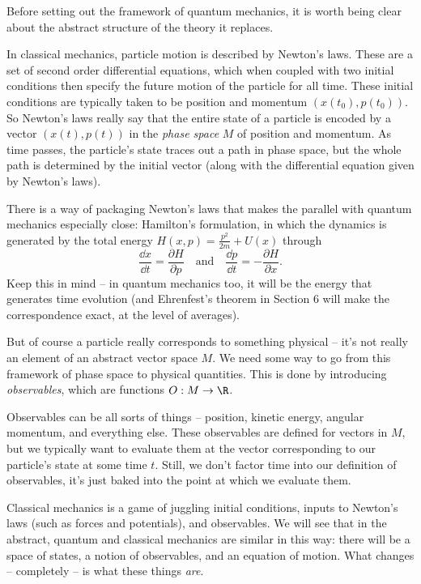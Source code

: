 Before setting out the framework of quantum mechanics, it is worth being clear about the abstract structure of the theory it replaces.

In classical mechanics, particle motion is described by Newton's laws. These are a set of second order differential equations, which when coupled with two initial conditions then specify the future motion of the particle for all time. These initial conditions are typically taken to be position and momentum $(x(t_0), p(t_0))$. So Newton's laws really say that the entire state of a particle is encoded by a vector $(x(t), p(t))$ in the \emph{phase space} $M$ of position and momentum. As time passes, the particle's state traces out a path in phase space, but the whole path is determined by the initial vector (along with the differential equation given by Newton's laws).

There is a way of packaging Newton's laws that makes the parallel with quantum mechanics especially close: Hamilton's formulation, in which the dynamics is generated by the total energy $H(x, p) = \frac{p^2}{2m} + U(x)$ through
$$
\frac{\dd x}{\dd t} = \frac{\partial H}{\partial p} \quad \text{and} \quad \frac{\dd p}{\dd t} = -\frac{\partial H}{\partial x}.
$$
Keep this in mind -- in quantum mechanics too, it will be the energy that generates time evolution (and Ehrenfest's theorem in Section 6 will make the correspondence exact, at the level of averages).

But of course a particle really corresponds to something physical -- it's not really an element of an abstract vector space $M$. We need some way to go from this framework of phase space to physical quantities. This is done by introducing \emph{observables}, which are functions $O: M \rightarrow \R$.

Observables can be all sorts of things -- position, kinetic energy, angular momentum, and everything else. These observables are defined for vectors in $M$, but we typically want to evaluate them at the vector corresponding to our particle's state at some time $t$. Still, we don't factor time into our definition of observables, it's just baked into the point at which we evaluate them.

Classical mechanics is a game of juggling initial conditions, inputs to Newton's laws (such as forces and potentials), and observables. We will see that in the abstract, quantum and classical mechanics are similar in this way: there will be a space of states, a notion of observables, and an equation of motion. What changes -- completely -- is what these things \emph{are}.

